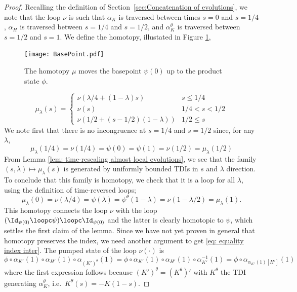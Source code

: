 \begin{proof}
	Recalling the definition of Section~\ref{sec:Concatenation of evolutions}, we note that the loop $\nu$ is such that  ${\alpha_{K}}$ is traversed between times $s=0$ and $s=1/4$, $\alpha_{H}$ is traversed between $s=1/4$ and $s=1/2$, and ${\alpha^\theta_{K}}$ is traversed between $s=1/2$ and $s=1$. We define the homotopy, illustated in   Figure \ref{fig: homotopytoproductbase}, 
	\begin{figure}[h] 
		\begin{center}
			\texttt{[image: BasePoint.pdf]}
			\caption{The homotopy $\mu$ moves the basepoint $\psi(0)$ up to the product state $\phi$.}
			\label{fig: homotopytoproductbase}
		\end{center}
	\end{figure}
	$$
	\mu_\lambda(s) = \begin{cases}  \nu(\lambda/4+(1-\lambda)s )  &   s\leq 1/4 \\
		\nu(s)&   1/4 < s < 1/2 \\
		\nu(1/2 + (s-1/2)(1-\lambda) )   &     1/2\leq s
	\end{cases}
	$$
	We note first that there is no incongruence at $s=1/4$ and $s=1/2$ since, for any $\lambda$, 
	$$
	\mu_\lambda(1/4)= \nu(1/4 ) = \psi(0)=\psi(1)=   \nu(1/2 ) =  \mu_\lambda(1/2)
	$$
	From Lemma \ref{lem: time-rescaling almost local evolutions}, we see that the family $(s,\lambda)\mapsto \mu_\lambda(s)$ is generated by uniformly bounded TDIs in $s$ and $\lambda$ direction. To conclude that this family is homotopy, we check that it is a loop for all $\lambda$, using the definition of time-reversed loops;
	$$
	\mu_\lambda(0) =\nu(\lambda/4 )=\psi(\lambda) ={\psi^\theta}(1-\lambda)= \nu(1-\lambda/2)=         \mu_\lambda(1). $$
	This homotopy connects the loop $\nu$ with the loop $(\Id_{\psi(0)} \loopc \psi) \loopc  \Id_{\psi(0)}$ and the latter is clearly homotopic to $\psi$, which settles the first claim of the lemma. 
	Since we have not yet proven in general that homotopy preserves the index,  we need another argument to get \eqref{eq: equality index inter}.  The pumped state of the loop $\nu(\cdot)$ is
	\begin{equation}\label{Complicated Pumped State}
		\phi \circ   \alpha_{K'}(1)\circ \alpha_{H'}(1) \circ \alpha_{(K')^\theta}(1)=  
		\phi \circ   \alpha_{K'}(1)\circ \alpha_{H'}(1) \circ  \alpha_{K'}^{-1}(1) = 
		\phi \circ \alpha_{\alpha_{K'}(1)[H']}(1) 
	\end{equation}
	where the first expression follows because  $(K')^\theta=(K^\theta)'$ with $K^\theta$ the TDI generating ${\alpha^\theta_K}$, i.e.\ ${K^\theta(s)}=-K(1-s)$. 

\end{proof}
